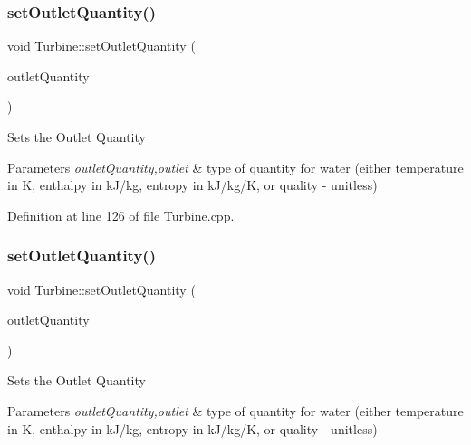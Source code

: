 \subsubsection{\texorpdfstring{set\+Outlet\+Quantity()}{setOutletQuantity()}\hspace{0.1cm}{\footnotesize\ttfamily [1/3]}}
{\footnotesize\ttfamily void Turbine\+::set\+Outlet\+Quantity (\begin{DoxyParamCaption}\item[{\hyperlink{class_steam_properties_ae0294bedf7d178c2d8fb6aed0f62fbff}{Steam\+Properties\+::\+Thermodynamic\+Quantity}}]{outlet\+Quantity }\end{DoxyParamCaption})}

Sets the Outlet Quantity


\begin{DoxyParams}{Parameters}
{\em outlet\+Quantity,outlet} & type of quantity for water (either temperature in K, enthalpy in k\+J/kg, entropy in k\+J/kg/K, or quality -\/ unitless) \\
\hline
\end{DoxyParams}


Definition at line 126 of file Turbine.\+cpp.

\mbox{\label{class_turbine_ad5ff4ba1657aac9519a6841336ec571c}} 
\subsubsection{\texorpdfstring{set\+Outlet\+Quantity()}{setOutletQuantity()}\hspace{0.1cm}{\footnotesize\ttfamily [2/3]}}
{\footnotesize\ttfamily void Turbine\+::set\+Outlet\+Quantity (\begin{DoxyParamCaption}\item[{\hyperlink{class_steam_properties_ae0294bedf7d178c2d8fb6aed0f62fbff}{Steam\+Properties\+::\+Thermodynamic\+Quantity}}]{outlet\+Quantity }\end{DoxyParamCaption})}

Sets the Outlet Quantity


\begin{DoxyParams}{Parameters}
{\em outlet\+Quantity,outlet} & type of quantity for water (either temperature in K, enthalpy in k\+J/kg, entropy in k\+J/kg/K, or quality -\/ unitless) \\
\hline
\end{DoxyParams}
\mbox{\label{class_turbine_ad5ff4ba1657aac9519a6841336ec571c}} 
